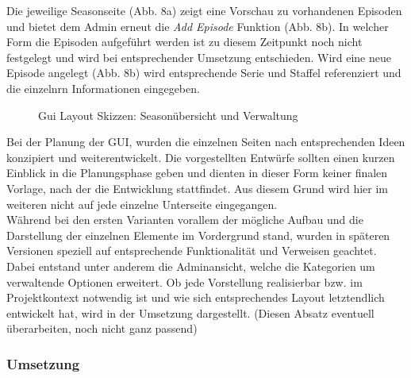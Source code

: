 Die jeweilige Seasonseite (Abb. 8a) zeigt eine Vorschau zu vorhandenen Episoden und bietet dem Admin erneut die \textit{Add Episode} Funktion (Abb. 8b). In welcher Form die Episoden aufgeführt werden ist zu diesem Zeitpunkt noch nicht festgelegt und wird bei entsprechender Umsetzung entschieden. Wird eine neue Episode angelegt (Abb. 8b) wird entsprechende Serie und Staffel referenziert und die einzelnrn Informationen eingegeben.\\
\begin{figure} [h!]
\centering
\hfill %
\hfill %
\hfill %
\caption{Gui Layout Skizzen: Seasonübersicht und Verwaltung }
\label{Gui}
\end{figure}

Bei der Planung der GUI, wurden die einzelnen Seiten nach entsprechenden Ideen konzipiert und weiterentwickelt. Die vorgestellten Entwürfe sollten einen kurzen Einblick in die Planungsphase geben und dienten in dieser Form keiner finalen Vorlage, nach der die Entwicklung stattfindet. Aus diesem Grund wird hier im weiteren nicht auf jede einzelne Unterseite eingegangen.\\ Während bei den ersten Varianten vorallem der mögliche Aufbau und die Darstellung der einzelnen Elemente im Vordergrund stand, wurden in späteren Versionen speziell auf entsprechende Funktionalität und Verweisen geachtet. Dabei entstand unter anderem die Adminansicht, welche die Kategorien um verwaltende Optionen erweitert. Ob jede Vorstellung realisierbar bzw. im Projektkontext notwendig ist und wie sich entsprechendes Layout letztendlich entwickelt hat, wird in der Umsetzung dargestellt. (Diesen Absatz eventuell überarbeiten, noch nicht ganz passend) \\

\newpage
\subsubsection{Umsetzung}
